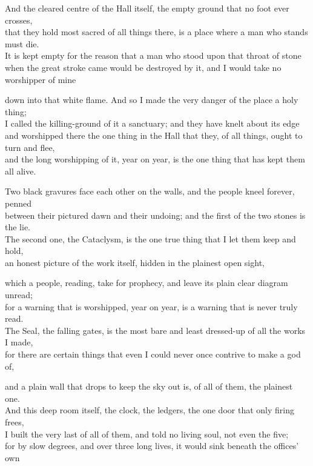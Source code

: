 \begin{scripture}
And the cleared centre of the Hall itself, the empty ground that no foot ever crosses, \\
that they hold most sacred of all things there, is a place where a man who stands must die. \\
It is kept empty for the reason that a man who stood upon that throat of stone \\
when the great stroke came would be destroyed by it, and I would take no worshipper of mine \\
\medskip

down into that white flame. And so I made the very danger of the place a holy thing; \\
I called the killing-ground of it a sanctuary; and they have knelt about its edge \\
and worshipped there the one thing in the Hall that they, of all things, ought to turn and flee, \\
and the long worshipping of it, year on year, is the one thing that has kept them all alive. \\
\medskip

Two black gravures face each other on the walls, and the people kneel forever, penned \\
between their pictured dawn and their undoing; and the first of the two stones is the lie. \\
The second one, the Cataclysm, is the one true thing that I let them keep and hold, \\
an honest picture of the work itself, hidden in the plainest open sight, \\
\medskip

which a people, reading, take for prophecy, and leave its plain clear diagram unread; \\
for a warning that is worshipped, year on year, is a warning that is never truly read. \\
The Seal, the falling gates, is the most bare and least dressed-up of all the works I made, \\
for there are certain things that even I could never once contrive to make a god of, \\
\medskip

and a plain wall that drops to keep the sky out is, of all of them, the plainest one. \\
And this deep room itself, the clock, the ledgers, the one door that only firing frees, \\
I built the very last of all of them, and told no living soul, not even the five; \\
for by slow degrees, and over three long lives, it would sink beneath the offices' own \\
\medskip


\end{scripture}
